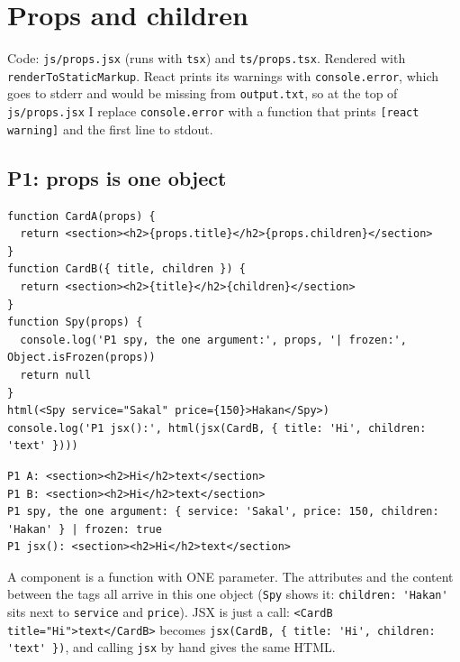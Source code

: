 \section{Props and children}\label{props-and-children}

Code: \passthrough{\lstinline!js/props.jsx!} (runs with \passthrough{\lstinline!tsx!}) and \passthrough{\lstinline!ts/props.tsx!}. Rendered with \passthrough{\lstinline!renderToStaticMarkup!}.
React prints its warnings with \passthrough{\lstinline!console.error!}, which goes to stderr and would be missing from \passthrough{\lstinline!output.txt!},
so at the top of \passthrough{\lstinline!js/props.jsx!} I replace \passthrough{\lstinline!console.error!} with a function that prints \passthrough{\lstinline![react warning]!} and the first line to stdout.

\subsection{P1: props is one object}\label{p1-props-is-one-object}

\begin{lstlisting}
function CardA(props) {
  return <section><h2>{props.title}</h2>{props.children}</section>
}
function CardB({ title, children }) {
  return <section><h2>{title}</h2>{children}</section>
}
function Spy(props) {
  console.log('P1 spy, the one argument:', props, '| frozen:', Object.isFrozen(props))
  return null
}
html(<Spy service="Sakal" price={150}>Hakan</Spy>)
console.log('P1 jsx():', html(jsx(CardB, { title: 'Hi', children: 'text' })))
\end{lstlisting}

\begin{lstlisting}
P1 A: <section><h2>Hi</h2>text</section>
P1 B: <section><h2>Hi</h2>text</section>
P1 spy, the one argument: { service: 'Sakal', price: 150, children: 'Hakan' } | frozen: true
P1 jsx(): <section><h2>Hi</h2>text</section>
\end{lstlisting}

A component is a function with ONE parameter. The attributes and the content between the tags all arrive in this one object
(\passthrough{\lstinline!Spy!} shows it: \passthrough{\lstinline!children: 'Hakan'!} sits next to \passthrough{\lstinline!service!} and \passthrough{\lstinline!price!}). JSX is just a call: \passthrough{\lstinline!<CardB title="Hi">text</CardB>!}
becomes \passthrough{\lstinline!jsx(CardB, \{ title: 'Hi', children: 'text' \})!}, and calling \passthrough{\lstinline!jsx!} by hand gives the same HTML.

